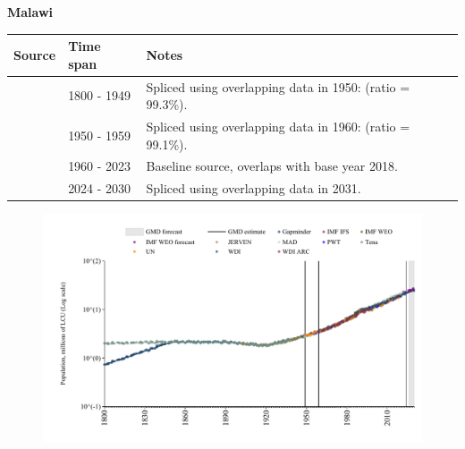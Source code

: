 \documentclass[12pt,a4paper,landscape]{article}
\begin{document}
\begin{adjustbox}{max totalsize={\paperwidth}{\paperheight},center}
\begin{minipage}[t][\textheight][t]{\textwidth}
\vspace*{0.5cm}
{}
\begin{center}
{\Large\bfseries Malawi}
\end{center}
\vspace{0.5cm}
\begin{table}[H]
\centering
\small
\begin{tabular}{|l|l|l|}
\hline
\textbf{Source} & \textbf{Time span} & \textbf{Notes} \\
\hline
\rowcolor{white}\cite{Gapminder}& 1800 - 1949 &Spliced using overlapping data in 1950: (ratio = 99.3\%).\\
\rowcolor{lightgray}\cite{IMF_IFS}& 1950 - 1959 &Spliced using overlapping data in 1960: (ratio = 99.1\%).\\
\rowcolor{white}\cite{WDI}& 1960 - 2023 &Baseline source, overlaps with base year 2018.\\
\rowcolor{lightgray}\cite{Gapminder}& 2024 - 2030 &Spliced using overlapping data in 2031.\\
\hline
\end{tabular}
\end{table}
\begin{figure}[H]
\centering
\includegraphics[width=\textwidth,height=0.6\textheight,keepaspectratio]{graphs/MWI_pop.pdf}
\end{figure}
\end{minipage}
\end{adjustbox}
\end{document}
